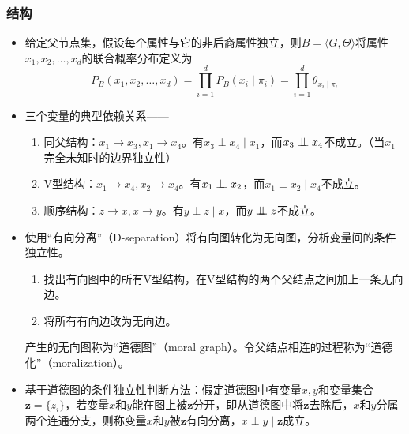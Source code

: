 \documentclass{ctexart}
\newcommand{\bigCI}{\mathrel{\text{\scalebox{1.07}{$\perp\mkern-10mu\perp$}}}}
\begin{document}
					\subsubsection{结构}
						\begin{itemize}
							\item 给定父节点集，假设每个属性与它的非后裔属性独立，则$B=\langle G,\Theta\rangle$将属性$x_1,x_2,\dots,x_d$的联合概率分布定义为\[P_B(x_1,x_2,\dots,x_d)=\prod_{i=1}^{d}P_B(x_i\mid\pi_i)=\prod_{i=1}^{d}\theta_{x_i\mid\pi_i}\]
							\item 三个变量的典型依赖关系——\begin{enumerate}
								\item 同父结构：$x_1\rightarrow x_3,x_1\rightarrow x_4$。有$x_3\perp x_4\mid x_1$，而$x_3\bigCI x_4$不成立。（当$x_1$完全未知时的边界独立性）
								\item V型结构：$x_1\rightarrow x_4,x_2\rightarrow x_4$。有$x_1\bigCI x_2$，而$x_1\perp x_2\mid x_4$不成立。
								\item 顺序结构：$z\rightarrow x,x\rightarrow y$。有$y\perp z\mid x$，而$y\bigCI z$不成立。
							\end{enumerate}
							\item 使用``有向分离''（D-separation）将有向图转化为无向图，分析变量间的条件独立性。\begin{enumerate}
								\item 找出有向图中的所有V型结构，在V型结构的两个父结点之间加上一条无向边。
								\item 将所有有向边改为无向边。
							\end{enumerate}
							产生的无向图称为``道德图''（moral graph）。令父结点相连的过程称为``道德化''（moralization）。
							\item 基于道德图的条件独立性判断方法：假定道德图中有变量$x,y$和变量集合$\bm{z}=\{z_i\}$，若变量$x$和$y$能在图上被$\bm{z}$分开，即从道德图中将$\bm{z}$去除后，$x$和$y$分属两个连通分支，则称变量$x$和$y$被$\bm{z}$有向分离，$x\perp y\mid\bm{z}$成立。 
						\end{itemize}
\end{document}
